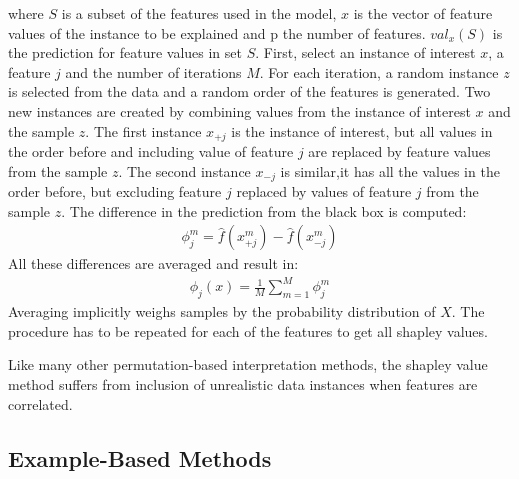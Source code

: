 where $S$ is a subset of the features used in the model, $x$ is the vector of feature values of the instance to be explained and p the number of features. $val_x(S)$ is the prediction for feature values in set $S$.
First, select an instance of interest $x$, a feature $j$ and the number of iterations $M$. For each iteration, a random instance $z$ is selected from the data and a random order of the features is generated. Two new instances are created by combining values from the instance of interest $x$ and the sample $z$. The first instance $x_{+j}$ is the instance of interest, but all values in the order before and including value of feature $j$ are replaced by feature values from the sample $z$. The second instance $x_{-j}$ is similar,it has all the values in the order before, but excluding feature $j$ replaced by values of feature $j$ from the sample $z$. The difference in the prediction from the black box is computed:
\begin{equation}
\begin{aligned}
\phi_j^{m}=\hat{f}(x^m_{+j})-\hat{f}(x^m_{-j})
\end{aligned}
\label{eqn:eq6}
\end{equation}
All these differences are averaged and result in:
\begin{equation}
\begin{aligned}
\phi_j(x)=\frac{1}{M}\sum_{m=1}^M\phi_j^{m}
\end{aligned}
\label{eqn:eq7}
\end{equation}
Averaging implicitly weighs samples by the probability distribution of $X$. The procedure has to be repeated for each of the features to get all shapley values.

Like many other permutation-based interpretation methods, the shapley value method suffers from inclusion of unrealistic data instances when features are correlated. 

\subsection{Example-Based Methods}

